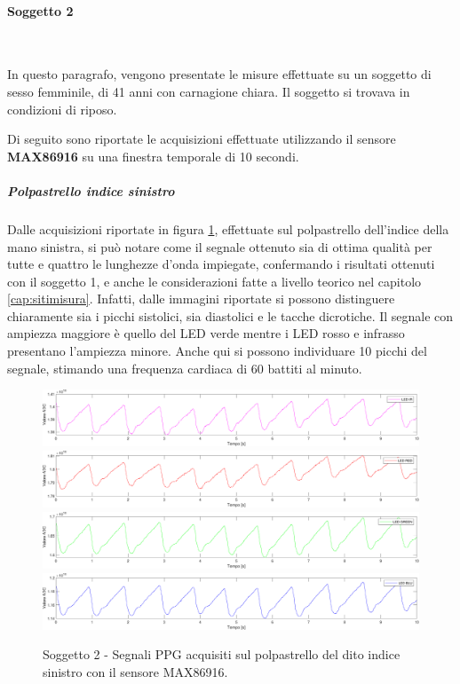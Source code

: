 \clearpage
\paragraph{Soggetto 2}~

\vspace{1cm}

\noindent In questo paragrafo, vengono presentate le misure effettuate su un soggetto di sesso femminile, di 41 anni con carnagione chiara. Il soggetto si trovava in condizioni di riposo.

\vspace{0.5cm}

\noindent Di seguito sono riportate le acquisizioni effettuate utilizzando il sensore \textbf{MAX86916} su una finestra temporale di 10 secondi.

\subparagraph{Polpastrello indice sinistro}
Dalle acquisizioni riportate in figura \ref{fig:soggetto2_MAX86916_polpastrello}, effettuate sul polpastrello dell'indice della mano sinistra, si può notare come il segnale ottenuto sia di ottima qualità per tutte e quattro le lunghezze d'onda impiegate, confermando i risultati ottenuti con il soggetto 1, e anche le considerazioni fatte a livello teorico nel capitolo \ref{cap:sitimisura}. Infatti, dalle immagini riportate si possono distinguere chiaramente sia i picchi sistolici, sia diastolici e le tacche dicrotiche. Il segnale con ampiezza maggiore è quello del LED verde mentre i LED rosso e infrasso presentano l'ampiezza minore. Anche qui si possono individuare 10 picchi del segnale, stimando una frequenza cardiaca di 60 battiti al minuto.
\begin{figure}[h]
	\centering
	\includegraphics[width=1\linewidth]{ImageFiles/Misure Preliminari/Soggetto 2/max86916/polpastrello_ired}
	\includegraphics[width=1\linewidth]{ImageFiles/Misure Preliminari/Soggetto 2/max86916/polpastrello_red}
	\includegraphics[width=1\linewidth]{ImageFiles/Misure Preliminari/Soggetto 2/max86916/polpastrello_green}
	\includegraphics[width=1\linewidth]{ImageFiles/Misure Preliminari/Soggetto 2/max86916/polpastrello_blu}
	\caption{Soggetto 2 - Segnali PPG acquisiti sul polpastrello del dito indice sinistro con il sensore MAX86916.}
	\label{fig:soggetto2_MAX86916_polpastrello}
\end{figure}

